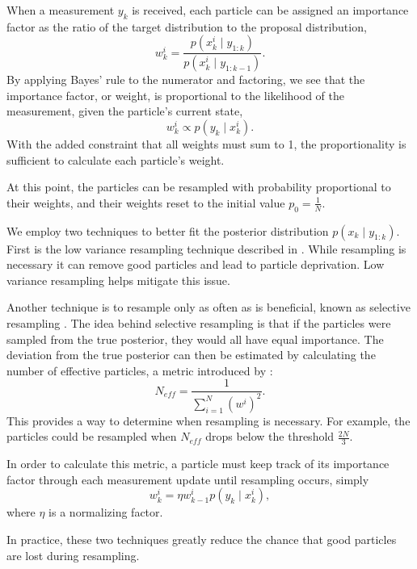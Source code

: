 \documentclass[letterpaper, 10 pt, conference]{ieeeconf}  %
\begin{document}
When a measurement $y_k$ is received, each particle can be assigned an importance factor as the ratio of the target distribution to the proposal distribution,
\begin{equation}%
    w^i_k = \frac{p(x^i_k \mid y_{1:k})}{p(x^i_k \mid y_{1:k-1})}.
\end{equation}
By applying Bayes' rule to the numerator and factoring, we see that the importance factor, or weight, is proportional to the likelihood of the measurement, given the particle's current state,
\begin{equation}%
    w^i_k \propto p(y_k \mid x^i_k).
\end{equation}
With the added constraint that all weights must sum to 1, the proportionality is sufficient to calculate each particle's weight.

At this point, the particles can be resampled with probability proportional to their weights, and their weights reset to the initial value $p_0 = \frac{1}{N}$.

We employ two techniques to better fit the posterior distribution $p(x_k \mid y_{1:k})$. First is the low variance resampling technique described in \cite{Thrun2006}. While resampling is necessary it can remove good particles and lead to particle deprivation. Low variance resampling helps mitigate this issue.

Another technique is to resample only as often as is beneficial, known as selective resampling \cite{Grisetti2005}. The idea behind selective resampling is that if the particles were sampled from the true posterior, they would all have equal importance. The deviation from the true posterior can then be estimated by calculating the number of effective particles, a metric introduced by \cite{Liu1996}:
\begin{equation}%
N_{eff} = \frac{1}{\sum_{i=1}^N (w^i)^2}.
\end{equation}
This provides a way to determine when resampling is necessary. For example, the particles could be resampled when $N_{eff}$ drops below the threshold $\frac{2N}{3}$.

In order to calculate this metric, a particle must keep track of its importance factor through each measurement update until resampling occurs, simply
\begin{equation}%
    w^i_k = \eta w^i_{k-1} p(y_k \mid x^i_k),
\end{equation}
where $\eta$ is a normalizing factor.

In practice, these two techniques greatly reduce the chance that good particles are lost during resampling.
\end{document}

